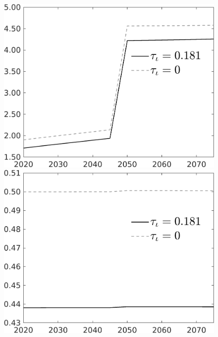 \documentclass[12pt]{article}
\begin{document}
\begin{figure}[h!!]
\begin{minipage}[]{0.32\textwidth}
		\includegraphics[width=1\textwidth]{../../codding_model/own_basedOnFried/optimalPol_010922_revision/figures/all_13Sept22/CompTauf_bytaul_Reg0_tauf_spillover0_nsk0_xgr0_knspil1_sep0_LFlimit1_emsbase0_countec0_GovRev0_etaa0.79_lgd1.png}
	\end{minipage}	
	\begin{minipage}[]{0.32\textwidth}
		\includegraphics[width=1\textwidth]{../../codding_model/own_basedOnFried/optimalPol_010922_revision/figures/all_13Sept22/CompTauf_bytaul_Reg0_hh_spillover0_nsk0_xgr0_knspil1_sep0_LFlimit1_emsbase0_countec0_GovRev0_etaa0.79_lgd1.png}

\end{minipage}
\end{figure}
\end{document}
